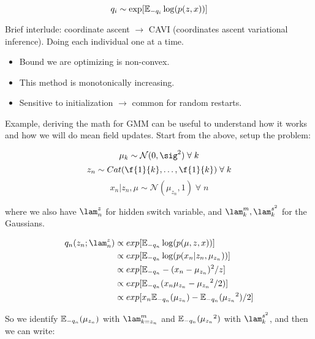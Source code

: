 \documentclass{article}
\begin{document}
\[ q_i \sim \exp[ \mathbb{E}_{-q_i} \log(p(z,x)) ]\]

Brief interlude: coordinate ascent $\to$ CAVI (coordinates ascent variational inference). Doing each individual one at a time.
\begin{itemize}
\item Bound we are optimizing is non-convex.
\item This method is monotonically increasing.
\item Sensitive to initialization $\to$ common for random restarts.
\end{itemize}

\bigskip

Example, deriving the math for GMM can be useful to understand how it works and how we will do mean field updates. Start from the above, setup the problem:

\[ \mu_k \sim \mathcal{N}(0,\sig^2) \;\forall\;k \]
\[ z_n \sim Cat(\f{1}{k}, \dots,\f{1}{k}) \;\forall\; k\]
\[ x_n | z_n, \mu \sim \mathcal{N}(\mu_{z_n},1) \; \forall \; n \]

where we also have $\lam_n^z$ for hidden switch variable, and $\lam_k^m, \lam_k^{s^2}$ for the Gaussians.

\begin{align*}
q_n(z_n; \lam_n^z) &\propto exp[\E_{-q_n} \log (p(\mu,z,x))] \\
&\propto exp[\E_{-q_n} \log (p(x_n|z_n, \mu_{z_n}))] \\
&\propto exp[\E_{-q_n} - (x_n - \mu_{z_n})^2 / z] \\
&\propto exp[\E_{-q_n} (x_n\mu_{z_n} - \mu_{z_n}{}^2 / 2)]\\
&\propto exp[x_n \E_{-q_n}(\mu_{z_n}) - \E_{-q_n}(\mu_{z_n}{}^2) / 2]\\
\end{align*}


\begin{center}
\end{center}

So we identify $ \mathbb{E}_{-q_n}(\mu_{z_n})$ with $\lam_{k=z_n}^m$ and $\mathbb{E}_{-q_n}(\mu_{z_n}{}^2)$ with $\lam_k^{s^2}$, and then we can write:
\end{document}
